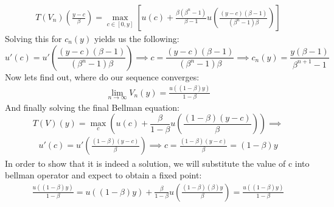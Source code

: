 \documentclass[11pt, oneside]{article}
\renewcommand{\b}{\beta}
\begin{document}
\begin{enumerate}[(a)]
\begin{gather*}
	T(V_{n})\left(\frac{y-c}{\b}\right) = \max_{c\in[0, y]} \left[ u(c) +  \frac{\b(\b^{n} - 1)}{\b - 1} u \left(\frac{(y-c)(\b - 1)}{(\b^{n} - 1)\b}\right)\right]
\end{gather*}
Solving this for $ c_{n}(y) $ yields us the following:
\[
u'(c) = u'\left( \frac{(y-c)(\b - 1)}{(\b^{n} - 1) \b} \right) \implies c = \frac{(y-c)(\b - 1)}{(\b^{n} - 1)\b} \implies c_{n}(y) = \frac{y(\b - 1)}{\b^{n+1} - 1}
\]
Now lets find out, where do our sequence converges:
\begin{gather*}
	\lim_{n\to\infty}V_{n}(y) = \frac{u\left((1-\b)y\right)}{1-\b}
\end{gather*}
And finally solving the final Bellman equation:
\[
T(V)(y) = \max_{c} \left( u(c) + \frac{\b}{1-\b} u\left( \frac{(1-\b)(y-c)}{\b} \right)\right) \implies
\]
\begin{align*}
	u'(c) = u'\left( \frac{(1-\b)(y-c)}{\b} \right) \implies c = \frac{(1-\b) (y-c)}{\b} = (1-\b)y
\end{align*}
In order to show that it is indeed a solution, we will substitute the value of c into bellman operator and expect to obtain a fixed point:
\begin{align*}
	 \frac{u\left((1-\b)y\right)}{1-\b} = u((1-\b)y) + \frac{\b}{1-\b}u\left( \frac{(1-\b)(\b)y}{\b}\right) =  \frac{u\left((1-\b)y\right)}{1-\b} 
\end{align*}
\end{enumerate}
\clearpage
\end{document}
